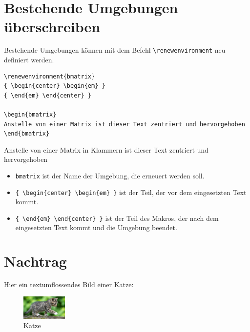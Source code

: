 \documentclass[ngerman,12pt,titlepage]{scrartcl}
\newenvironment{hlbox}{\begin{tcolorbox}[enhanced,colback=white,colframe=white,sharpish corners,fuzzy halo=0.5mm with lightgray]}{\end{tcolorbox}}
\renewenvironment{bmatrix}
{ \begin{center} \begin{em} }
{ \end{em} \end{center} }
\begin{document}
\newpage

\section{Bestehende Umgebungen überschreiben}
\label{sec:UmgUeberschreiben}
Bestehende Umgebungen können mit dem Befehl \lstinline|\renewenvironment| neu definiert werden. 
\begin{lstlisting}
\renewenvironment{bmatrix}
{ \begin{center} \begin{em} }
{ \end{em} \end{center} }

\begin{bmatrix}
Anstelle von einer Matrix ist dieser Text zentriert und hervorgehoben
\end{bmatrix}
\end{lstlisting}
\begin{hlbox}
\begin{bmatrix}
Anstelle von einer Matrix in Klammern ist dieser Text zentriert und hervorgehoben
\end{bmatrix}
\end{hlbox}
\begin{itemize}
\item[] \lstinline|bmatrix| ist der Name der Umgebung, die erneuert werden soll.
\item[] \lstinline|{ \begin{center} \begin{em} }| ist der Teil, der vor dem eingesetzten Text kommt.
\item[] \lstinline|{ \end{em} \end{center} }| ist der Teil des Makros, der nach dem eingesetzten Text kommt und die Umgebung beendet.
\end{itemize}

\section{Nachtrag}
Hier ein textumflossendes Bild einer Katze:

\begin{figure}
\centering
\includegraphics[width=0.2\textwidth]{katze}
\caption{Katze}
\label{fig:katze}
\end{figure}

\lipsum[1]

\newpage
\printbibliography
\newpage
\lstlistoflistings
\listoffigures
\end{document}
